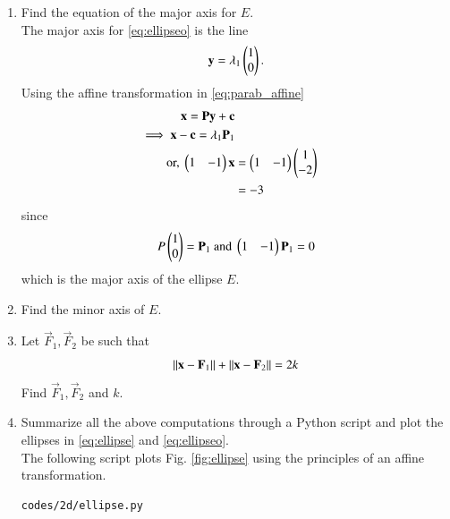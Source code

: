 \begin{enumerate}[label=\arabic*.,ref=\thesubsection.\theenumi]
\item Find the equation of the major axis for $E$.
\\
\solution  The major axis for \eqref{eq:ellipseo} is the line
\begin{equation}
\mathbf{y} = \lambda_1\begin{pmatrix}1 \\ 0\end{pmatrix}.
\end{equation}
Using the affine transformation in \eqref{eq:parab_affine}
\begin{align}
\mathbf{x}= \mathbf{P}\mathbf{y}+\mathbf{c}
\\ 
\implies  \mathbf{x}-\mathbf{c}= \lambda_1\mathbf{P}_1
\\ 
\text{or, }\begin{pmatrix}1 & -1\end{pmatrix}\mathbf{x}&= \begin{pmatrix}1 & -1\end{pmatrix}\begin{pmatrix}1 \\ -2\end{pmatrix}
\\
&= -3
\end{align}
%
since 
\begin{align}
P\begin{pmatrix}1 \\ 0\end{pmatrix}=\mathbf{P}_1\text{ and } \begin{pmatrix}1 & -1\end{pmatrix}\mathbf{P}_1 = 0
\end{align}
%
which is the major axis of the ellipse $E$.
\item Find the minor axis of $E$.
%
\item Let $\vec{F}_1,\vec{F}_2$ be such that
\begin{equation}
\left\lVert\mathbf{x}-\mathbf{F}_1\right\rVert
+\left\lVert\mathbf{x}-\mathbf{F}_2\right\rVert =2k
\end{equation}
Find $\vec{F}_1, \vec{F}_2$ and $k$.
\item Summarize all the above computations through a Python script and plot 
the ellipses in \eqref{eq:ellipse} and \eqref{eq:ellipseo}.
\\
\solution The following script plots Fig. \ref{fig:ellipse} using the 
principles of an affine transformation. 
\begin{lstlisting}
codes/2d/ellipse.py
\end{lstlisting}
\begin{figure}[!ht]
\centering

\end{figure}
\end{enumerate}
